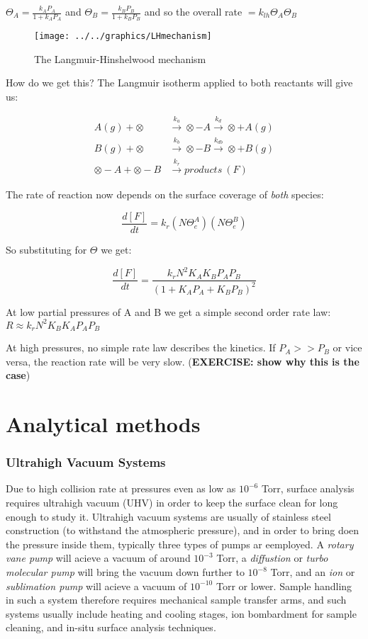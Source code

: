 \documentclass[ignorenonframetext]{beamer}
\begin{document}
\(\Theta_A = \frac{k_AP_A}{1+k_AP_A}\) and \(\Theta_B = \frac{k_BP_B}{1+k_BP_B}\) and so the overall rate \(= k_{lh}\Theta_A\Theta_B\)

\begin{figure}[H]
\centering
\texttt{[image: ../../graphics/LHmechanism]}
\caption{The Langmuir-Hinshelwood mechanism}
\end{figure}

How do we get this? The Langmuir isotherm applied to both reactants will give us:

\begin{align*}
A(g) + \otimes &\xrightarrow{k_a} \otimes-A \xrightarrow{k_d} \otimes + A(g)\\
B(g) + \otimes &\xrightarrow{k_b} \otimes-B \xrightarrow{k_{db}} \otimes + B(g)\\
\otimes-A + \otimes-B &\xrightarrow{k_r} products\ (F)
\end{align*}

The rate of reaction now depends on the surface coverage of \textit{both} species:

\[ \frac{d[F]}{dt} = k_r(N\Theta_e^A)(N\Theta_e^B)\]

So substituting for \(\Theta\) we get:

\[ \frac{d[F]}{dt} = \frac{k_rN^2K_AK_BP_AP_B}{(1+K_AP_A + K_BP_B)^2}\]

At low partial pressures of A and B we get a simple second order rate law: \(R \approx k_rN^2K_BK_AP_AP_B\)

At high pressures, no simple rate law describes the kinetics. If \(P_A >> P_B\) or vice versa, the reaction rate will be very slow.
(\textbf{EXERCISE: show why this is the case})

\part{Analytical methods}

\section{Ultrahigh Vacuum Systems}
Due to high collision rate at pressures even as low as \(10^{-6}\) Torr, surface analysis requires ultrahigh vacuum (UHV) in order to keep the surface clean for long enough to study it. Ultrahigh vacuum systems are usually of stainless steel construction (to withstand the atmospheric pressure), and in order to bring doen the pressure inside them, typically three types of pumps ar eemployed. A \textit{rotary vane pump} will acieve a vacuum of around \(10^{-3}\) Torr, a \textit{diffustion} or \textit{turbo molecular pump} will bring the vacuum down further to \(10^{-8}\) Torr, and an \textit{ion} or \textit{sublimation pump} will acieve a vacuum of \(10^{-10}\) Torr or lower. Sample handling in such a system therefore requires mechanical sample transfer arms, and such systems usually include heating and cooling stages, ion bombardment for sample cleaning, and in-situ surface analysis techniques.
\end{document}
